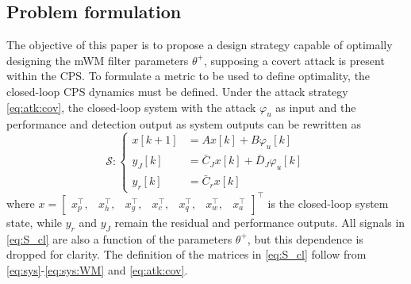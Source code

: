 \subsection{Problem formulation}\label{sec:PF:probFor}
The objective of this paper is to propose a design strategy capable of optimally designing the mWM filter parameters $\theta^+$, supposing a covert attack is present within the CPS. To formulate a metric to be used to define optimality, the closed-loop CPS dynamics must be defined. Under the attack strategy \eqref{eq:atk:cov}, the closed-loop system with the attack $\varphi_u$ as input and the performance and detection output as system outputs can be rewritten as
\begin{equation}\label{eq:S_cl}
		{\mathcal{S}}:\left\{
\begin{aligned}
{x}[k+1] &= A x[k] + B\varphi_u[k]\\
y_J[k] &= \bar{C}_J x[k] + \bar{D}_J \varphi_u[k]\\
y_r[k] &= \bar{C}_r x[k]
\end{aligned} \right.
	\end{equation}
where $x = \begin{bmatrix}x_p^\top, &x_h^\top, &x_g^\top, &x_c^\top, &x_q^\top, &x_w^\top, &x_a^\top\end{bmatrix}^\top$ is the closed-loop system state, while $y_r$ and $y_J$ remain the residual and performance outputs. All signals in \eqref{eq:S_cl} are also a function of the parameters $\theta^+$, but this dependence is dropped for clarity.
The definition of the matrices in \eqref{eq:S_cl} follow from \eqref{eq:sys}-\eqref{eq:sys:WM} and \eqref{eq:atk:cov}.

